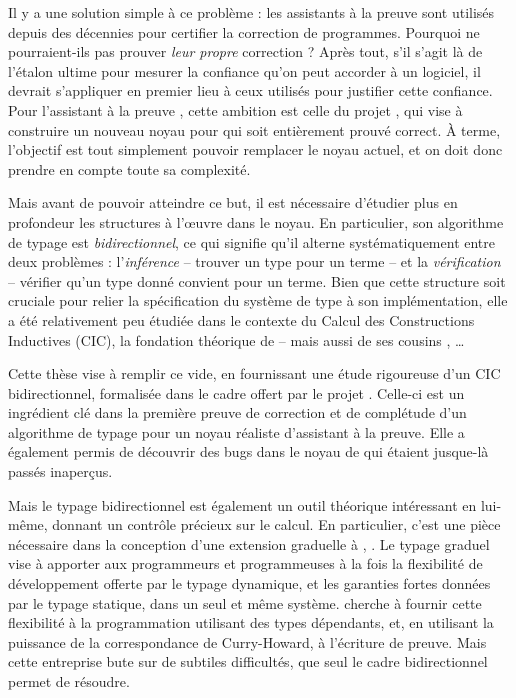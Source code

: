 Il y a une solution simple à ce problème : les assistants à la preuve sont utilisés depuis
des décennies pour certifier la correction de programmes. Pourquoi ne pourraient-ils pas
prouver \emph{leur propre} correction ? Après tout, s’il s’agit là de l’étalon ultime
pour mesurer la confiance qu’on peut accorder à un logiciel,
il devrait s’appliquer en premier lieu à ceux utilisés pour justifier cette
confiance. Pour l’assistant à la preuve , cette ambition est celle du projet
, qui vise à construire un nouveau noyau pour  qui soit entièrement
prouvé correct. À terme, l’objectif est tout simplement pouvoir remplacer le noyau actuel,
et on doit donc prendre en compte toute sa complexité.

Mais avant de pouvoir atteindre ce but, il est nécessaire d’étudier plus en profondeur
les structures à l’œuvre dans le noyau. En particulier, son algorithme de typage est
\emph{bidirectionnel}, ce qui signifie qu’il alterne systématiquement entre deux problèmes :
l’\emph{inférence} – trouver un type pour un terme – et la \emph{vérification} –
vérifier qu’un type donné convient pour un terme. Bien que cette structure soit cruciale pour
relier la spécification du système de type à son implémentation, elle a été relativement
peu étudiée dans le contexte du Calcul des Constructions Inductives (CIC), la fondation
théorique de  – mais aussi de ses cousins , …

Cette thèse vise à remplir ce vide, en fournissant une étude rigoureuse d’un CIC
bidirectionnel, formalisée dans le cadre offert par le projet . Celle-ci
est un ingrédient clé dans la première preuve de correction et de complétude d’un
algorithme de typage pour un noyau réaliste d’assistant à la preuve.
Elle a également permis de découvrir des bugs dans le noyau de  qui étaient
jusque-là passés inaperçus.

Mais le typage bidirectionnel est également un outil théorique intéressant en lui-même,
donnant un contrôle précieux sur le calcul. En particulier, c’est une pièce nécessaire
dans la conception d’une extension graduelle à , .
Le typage graduel vise à apporter aux programmeurs et programmeuses à la fois la flexibilité
de développement offerte par le typage dynamique, et les garanties fortes données par
le typage statique, dans un seul et même système.  cherche à fournir cette
flexibilité à la programmation utilisant des types dépendants, et, en utilisant la
puissance de la correspondance de Curry-Howard, à l’écriture de preuve. Mais cette
entreprise bute sur de subtiles difficultés, que seul le cadre bidirectionnel permet
de résoudre.

